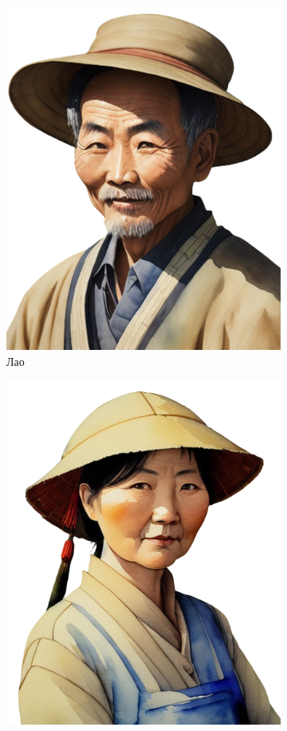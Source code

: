 \documentclass[a5paper,11pt]{memoir}
\begin{document}
\newpage
\begin{figure}[h]
	\begin{subfigure}{.3\textwidth}
		\centering
		\includegraphics[width=.8\linewidth]{images/lao-wang.png}
		\caption{Лао}
	\end{subfigure}%
	\begin{subfigure}{.3\textwidth}
		\centering
		\includegraphics[width=.8\linewidth]{images/lao-wife.png}

\end{subfigure}
\end{figure}
\end{document}

